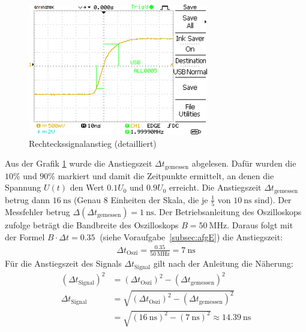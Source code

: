 \documentclass{article}
\begin{document}
\begin{enumerate}[label=\alph*]
         \begin{figure}[H]
             \centering
             \includegraphics[width=0.7\textwidth]{MesswerteVersuch0/A0005DS.png}
             \caption{Rechteckssignalanstieg (detailliert)}
             \label{fig:A0005DS}
         \end{figure}
         Aus der Grafik \ref{fig:A0005DS} wurde die Anstiegszeit $\Delta t_\mathrm{gemessen}$ abgelesen. Dafür wurden die $10\%$ und $90\%$ markiert und damit die Zeitpunkte ermittelt, an denen die Spannung $U(t)$ den Wert $0.1 U_0$ und $0.9 U_0$ erreicht. Die Anstiegszeit $\Delta t_\mathrm{gemessen}$ betrug dann $\SI{16}{\nano\second}$ (Genau $8$ Einheiten der Skala, die je $\frac{1}{5}$ von $\SI{10}{\nano\second}$ sind). Der Messfehler betrug $\Delta(\Delta t_\mathrm{gemessen}) =  \SI{1}{\nano\second}$. Der Betriebsanleitung des Oszilloskops \cite{anleitung} zufolge beträgt die Bandbreite des Oszilloskops $B = \SI{50}{\mega\hertz}$\cite{oszibedienungsanleitung}. Daraus folgt mit der Formel $B \cdot \Delta t = \SI{0.35}{}$ (siehe Voraufgabe~\ref{subsec:afgE}) die Anstiegszeit:
         \begin{align*}
             \Delta t_\mathrm{Oszi} = \frac{0.35}{\SI{50}{\mega\hertz}} = \SI{7}{\nano\second}
         \end{align*}
         Für die Anstiegszeit des Signals $\Delta t_\mathrm{Signal}$ gilt nach der Anleitung\cite{anleitung} die Näherung:
         \begin{align*}
             (\Delta t_\mathrm{Signal})^2 &= (\Delta t_\mathrm{Oszi})^2 - (\Delta t_\mathrm{gemessen})^2 \\
             \Delta t_\mathrm{Signal} &= \sqrt{(\Delta t_\mathrm{Oszi})^2 - (\Delta t_\mathrm{gemessen})^2} \\
             &= \sqrt{(\SI{16}{\nano\second})^2 - (\SI{7}{\nano\second})^2} \approx \SI{14.39}{\nano\second}
         \end{align*}

\end{enumerate}
\end{document}
